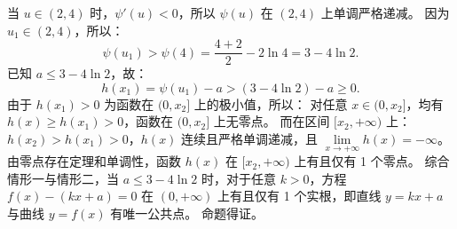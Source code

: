 \begin{answer}
   当 $u \in (2, 4)$ 时，$\psi'(u) < 0$，所以 $\psi(u)$ 在 $(2, 4)$ 上单调严格递减。
   因为 $u_1 \in (2, 4)$，所以：
\nopagebreak[4]
\[\psi(u_1) > \psi(4) = \dfrac{4 + 2}{2} - 2\ln 4 = 3 - 4\ln 2.\]
   已知 $a \leqslant 3 - 4\ln 2$，故：
\nopagebreak[4]
\[h(x_1) = \psi(u_1) - a > (3 - 4\ln 2) - a \geqslant 0.\]
   由于 $h(x_1) > 0$ 为函数在 $(0, x_2]$ 上的极小值，所以：
   对任意 $x \in (0, x_2]$，均有 $h(x) \geqslant h(x_1) > 0$，函数在 $(0, x_2]$ 上无零点。
   而在区间 $[x_2, +\infty)$ 上：
   $h(x_2) > h(x_1) > 0$，$h(x)$ 连续且严格单调递减，且 $\lim\limits_{x \to +\infty} h(x) = -\infty$。
   由零点存在定理和单调性，函数 $h(x)$ 在 $[x_2, +\infty)$ 上有且仅有 1 个零点。
综合情形一与情形二，当 $a \leqslant 3 - 4\ln 2$ 时，对于任意 $k > 0$，方程 $f(x) - (kx + a) = 0$ 在 $(0, +\infty)$ 上有且仅有 1 个实根，即直线 $y = kx + a$ 与曲线 $y = f(x)$ 有唯一公共点。
命题得证。



\end{answer}